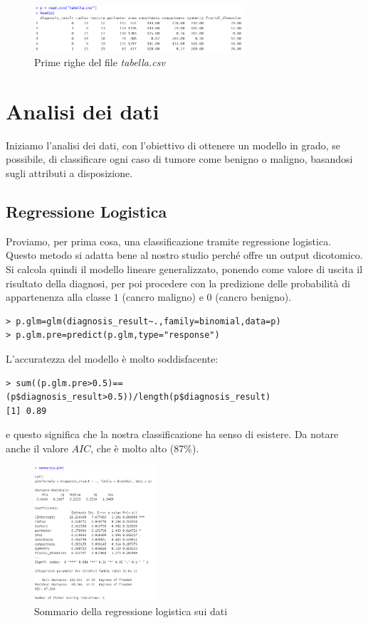 \documentclass[11pt,a4paper,oneside]{article}
\begin{document}
\begin{figure}[h]
\centering
\includegraphics[width=0.7\textwidth]{images/head}
\caption{Prime righe del file \textit{tabella.csv}}
\label{fig:head}
\end{figure}

\section{Analisi dei dati}
Iniziamo l'analisi dei dati, con l'obiettivo di ottenere un modello in grado, se possibile, di classificare ogni caso di tumore come benigno o maligno, basandosi sugli attributi a disposizione.
\subsection{Regressione Logistica}
Proviamo, per prima cosa, una classificazione tramite regressione logistica. Questo metodo si adatta bene al nostro studio perché offre un output dicotomico. Si calcola quindi il modello lineare generalizzato, ponendo come valore di uscita il risultato della diagnosi, per poi procedere con la predizione delle probabilità di appartenenza alla classe $1$ (cancro maligno) e $0$ (cancro benigno).
\begin{verbatim}
> p.glm=glm(diagnosis_result~.,family=binomial,data=p)
> p.glm.pre=predict(p.glm,type="response")
\end{verbatim}
L'accuratezza del modello è molto soddisfacente:
\begin{verbatim}
> sum((p.glm.pre>0.5)==(p$diagnosis_result>0.5))/length(p$diagnosis_result)
[1] 0.89
\end{verbatim}
e questo significa che la nostra classificazione ha senso di esistere. Da notare anche il valore $AIC$, che è molto alto (87\%).
\begin{figure}[h]
\centering
\includegraphics[width=0.4\textwidth]{images/glm}
\caption{Sommario della regressione logistica sui dati}
\label{fig:glm}
\end{figure}
\end{document}

